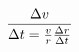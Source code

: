 \documentclass[preview]{standalone}
\begin{document}
\begin{align*}
\Delta v \over \Delta t = \frac{v}{r} \frac{\Delta r}{\Delta t}
\end{align*}
\end{document}
